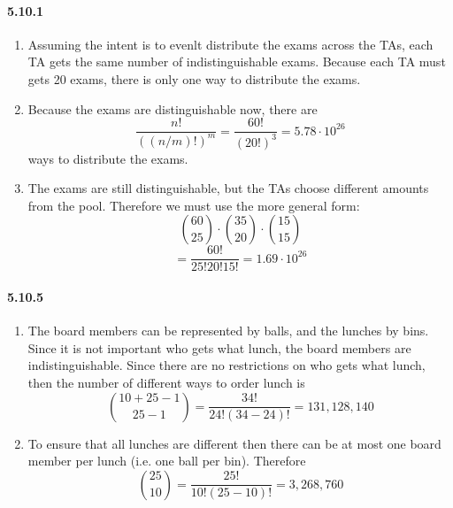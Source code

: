 \documentclass[11pt, letterpaper, twocolumn, fleqn]{article}
\begin{document}
\paragraph{5.10.1}
\begin{enumerate}
  \item Assuming the intent is to evenlt distribute the exams across the TAs, each TA gets the same number of indistinguishable exams. Because each TA must gets 20 exams, there is only one way to distribute the exams.
  \item Because the exams are distinguishable now, there are 
    $$\frac{n!}{((n/m)!)^m} = \frac{60!}{(20!)^3} = 5.78\cdot10^{26}$$
  ways to distribute the exams.
  \item The exams are still distinguishable, but the TAs choose different amounts from the pool. Therefore we must use the more general form:
    $$\binom{60}{25} \cdot \binom{35}{20} \cdot \binom{15}{15} $$
    $$ = \frac{60!}{25!20!15!} = 1.69\cdot10^{26}$$
\end{enumerate}

\paragraph{5.10.5}
\begin{enumerate}
  \item The board members can be represented by balls, and the lunches by bins. Since it is not important who gets what lunch, the board members are indistinguishable. Since there are no restrictions on who gets what lunch, then the number of different ways to order lunch is 
    $$\binom{10+25-1}{25-1} = \frac{34!}{24!(34-24)!} = 131,128,140$$
  \item To ensure that all lunches are different then there can be at most one board member per lunch (i.e. one ball per bin). Therefore
    $$\binom{25}{10} = \frac{25!}{10!(25-10)!} = 3,268,760$$
\end{enumerate}
\end{document}
